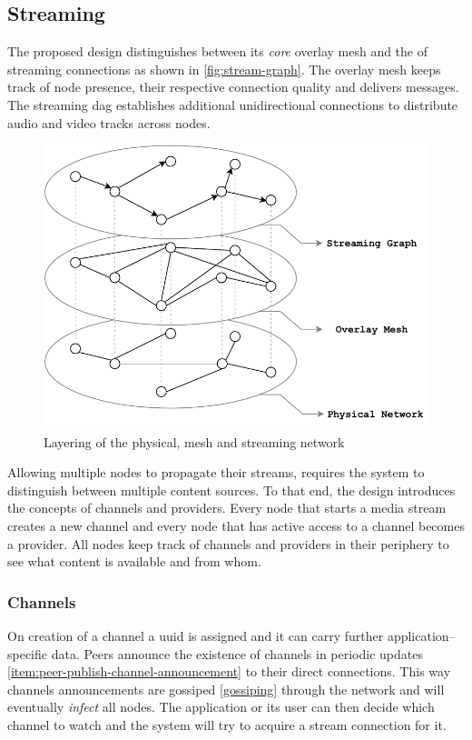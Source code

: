 \subsection{Streaming}\label{sec:design-stream}

The proposed design distinguishes between its \textit{core} overlay mesh and the  of streaming connections as shown in \vref{fig:stream-graph}. The overlay mesh keeps track of node presence, their respective connection quality and delivers messages. The streaming \gls{dag} establishes additional unidirectional connections to distribute audio and video tracks across nodes.

\begin{figure}
\centering
\includegraphics[width=.75\textwidth]{graphics/design/stream-graph.pdf}
\caption{Layering of the physical, mesh and streaming network}
\label{fig:stream-graph}
\end{figure}

Allowing multiple nodes to propagate their streams, requires the system to distinguish between multiple content sources. To that end, the design introduces the concepts of channels and providers. Every node that starts a media stream creates a new channel and every node that has active access to a channel becomes a provider. All nodes keep track of channels and providers in their periphery to see what content is available and from whom.

\subsubsection{Channels}\label{sec:design-stream-channel}
On creation of a channel a \gls{uuid} is assigned and it can carry further application–specific data. Peers announce the existence of channels in periodic updates \ref{item:peer-publish-channel-announcement} to their direct connections. This way channels announcements are gossiped \cref{gossiping} through the network and will eventually \textit{infect} all nodes. The application or its user can then decide which channel to watch and the system will try to acquire a stream connection for it.

